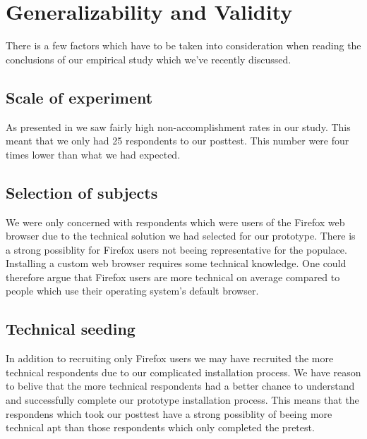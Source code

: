 \section{Generalizability and Validity}

\removeline

There is a few factors which have to be taken into consideration when reading
the conclusions of our empirical study which we've recently discussed.

\subsection{Scale of experiment}

As presented in 
we saw fairly high non-accomplishment rates in our study. This meant
that we only had 25 respondents to our posttest. This number were four times
lower than what we had expected.%

\subsection{Selection of subjects}

We were only
concerned with respondents which were users of the Firefox web browser
due to the technical solution we had selected for our prototype.
There is a strong possiblity for Firefox users not beeing representative for
the \urort{} populace. Installing a custom web browser%
requires some technical knowledge. One could therefore argue that Firefox
users are more technical on average compared to people which use their
operating system's default browser.

\subsection{Technical seeding}

In addition to recruiting only Firefox users we may have recruited the more
technical respondents due to our complicated installation process. We have
reason to belive that the more technical respondents had a better chance to
understand and successfully complete our prototype installation process. This
means that the respondens which took our posttest have a strong possiblity of
beeing more technical apt than those respondents which only completed the
pretest.

